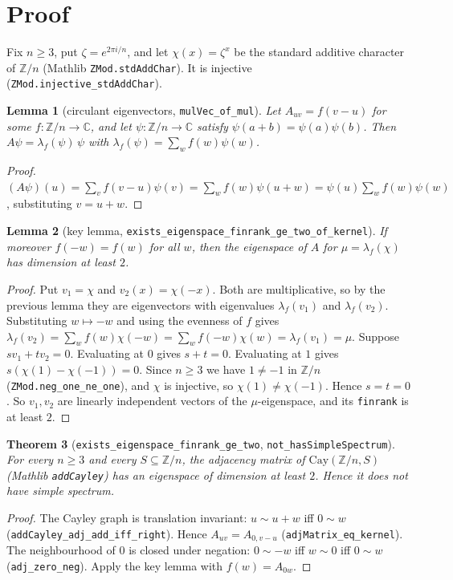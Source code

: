 \documentclass[11pt]{article}
\newtheorem{theorem}{Theorem}
\newtheorem{lemma}[theorem]{Lemma}
\theoremstyle{definition}
\theoremstyle{remark}
\begin{document}
\section{Proof}

Fix $n\ge 3$, put $\zeta=e^{2\pi i/n}$, and let $\chi(x)=\zeta^{x}$ be the standard additive
character of $\mathbb{Z}/n$ (Mathlib \texttt{ZMod.stdAddChar}). It is injective
(\texttt{ZMod.injective\_stdAddChar}).

\begin{lemma}[circulant eigenvectors, \texttt{mulVec\_of\_mul}]
Let $A_{uv}=f(v-u)$ for some $f:\mathbb{Z}/n\to\mathbb{C}$, and let
$\psi:\mathbb{Z}/n\to\mathbb{C}$ satisfy $\psi(a+b)=\psi(a)\psi(b)$. Then $A\psi=\lambda_f(\psi)\,\psi$
with $\lambda_f(\psi)=\sum_w f(w)\psi(w)$.
\end{lemma}
\begin{proof}
$(A\psi)(u)=\sum_v f(v-u)\psi(v)=\sum_w f(w)\psi(u+w)=\psi(u)\sum_w f(w)\psi(w)$, substituting $v=u+w$.
\end{proof}

\begin{lemma}[key lemma, \texttt{exists\_eigenspace\_finrank\_ge\_two\_of\_kernel}]
If moreover $f(-w)=f(w)$ for all $w$, then the eigenspace of $A$ for
$\mu=\lambda_f(\chi)$ has dimension at least $2$.
\end{lemma}
\begin{proof}
Put $v_1=\chi$ and $v_2(x)=\chi(-x)$. Both are multiplicative, so by the previous lemma they are
eigenvectors with eigenvalues $\lambda_f(v_1)$ and $\lambda_f(v_2)$. Substituting $w\mapsto -w$ and
using the evenness of $f$ gives
$\lambda_f(v_2)=\sum_w f(w)\chi(-w)=\sum_w f(-w)\chi(w)=\lambda_f(v_1)=\mu$.
Suppose $s v_1+t v_2=0$. Evaluating at $0$ gives $s+t=0$. Evaluating at $1$ gives
$s(\chi(1)-\chi(-1))=0$. Since $n\ge 3$ we have $1\ne -1$ in $\mathbb{Z}/n$
(\texttt{ZMod.neg\_one\_ne\_one}), and $\chi$ is injective, so $\chi(1)\ne\chi(-1)$. Hence
$s=t=0$. So $v_1,v_2$ are linearly independent vectors of the $\mu$-eigenspace, and its
\texttt{finrank} is at least $2$.
\end{proof}

\begin{theorem}[\texttt{exists\_eigenspace\_finrank\_ge\_two}, \texttt{not\_hasSimpleSpectrum}]
For every $n\ge 3$ and every $S\subseteq\mathbb{Z}/n$, the adjacency matrix of
$\mathrm{Cay}(\mathbb{Z}/n,S)$ (Mathlib \texttt{addCayley}) has an eigenspace of dimension at
least $2$. Hence it does not have simple spectrum.
\end{theorem}
\begin{proof}
The Cayley graph is translation invariant: $u\sim u+w$ iff $0\sim w$
(\texttt{addCayley\_adj\_add\_iff\_right}). Hence $A_{uv}=A_{0,v-u}$
(\texttt{adjMatrix\_eq\_kernel}). The neighbourhood of $0$ is closed under negation: $0\sim -w$
iff $w\sim 0$ iff $0\sim w$ (\texttt{adj\_zero\_neg}). Apply the key lemma with $f(w)=A_{0w}$.
\end{proof}
\end{document}
